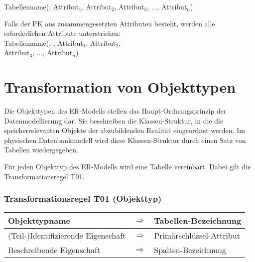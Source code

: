         \centerline{Tabellenname(, Attribut$_1$, Attribut$_2$, Attribut$_3$, ..., Attribut$_n$)}

        Falls der PK aus zusammengesetzten Attributen besteht, werden alle erforderlichen Attribute unterstrichen:\\
        \hspace*{12mm}Tabellenname(, , Attribut$_1$, Attribut$_2$,\\
        \hspace*{40mm}Attribut$_3$, ..., Attribut$_n$)
    \section{Transformation von Objekttypen}
      Die Objekttypen des ER-Modells stellen das Haupt-Ordnungsprinzip der Datenmodellierung dar. Sie beschreiben die Klassen-Struktur, in die die speicherrelevanten Objekte der abzubildenden Realit\"at eingeordnet werden. Im physischen Datenbankmodell wird diese Klassen-Struktur durch einen Satz von Tabellen wiedergegeben.

      F\"ur jeden Objekttyp des ER-Modells wird eine Tabelle vereinbart. Dabei gilt die Transformationsregel T01.
      \subsubsection{Transformationsregel T01 (Objekttyp)}
      \begin{supertabular}[h]{|l|l|p{7.5cm}|}
        \hline
        \footnotesize Objekttypname & $\Rightarrow$ & \footnotesize Tabellen-Bezeichnung\\
        \hline
        \footnotesize (Teil-)Identifizierende Eigenschaft & $\Rightarrow$ & \footnotesize Prim\"arschl\"ussel-Attribut\\
        \hline
        \footnotesize Beschreibende Eigenschaft & $\Rightarrow$ & \footnotesize Spalten-Bezeichnung\\
        \hline
      \end{supertabular}

      \begin{center}
      \end{center}
